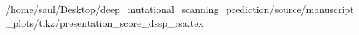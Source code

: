 /home/saul/Desktop/deep_mutational_scanning_prediction/source/manuscript_plots/tikz/presentation_score_dssp_rsa.tex